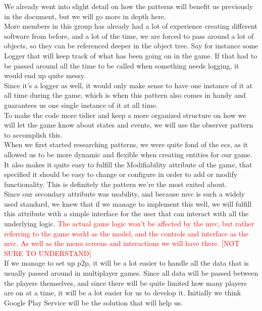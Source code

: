 We already went into slight detail on how the patterns will benefit us previously in the document, but we will go more in depth here. \\

More members in this group has already had a lot of experience creating different software from before, and a lot of the time, we are forced to pass around a lot of objects, so they can be referenced deeper in the object tree. Say for instance some Logger that will keep track of what has been going on in the game. If that had to be passed around all the time to be called when something needs logging, it would end up quite messy. \\

Since it's a logger as well, it would only make sense to have one instance of it at all time during the game, which is when this pattern also comes in handy and guarantees us one single instance of it at all time. \\

To make the code more tidier and keep a more organized structure on how we will let the game know about states and events, we will use the observer pattern to accomplish this. \\

When we first started researching patterns, we were quite fond of the \gls{ecs}, as it allowed us to be more dynamic and flexible when creating entities for our game. It also makes it quite easy to fulfill the Modifiability attribute of the game, that specified it should be easy to change or configure in order to add or modify functionality. This is definitely the pattern we're the most exited about. \\

Since our secondary attribute was usability, and because \gls{mvc} is such a widely used standard, we knew that if we manage to implement this well, we will fulfill this attribute with a simple interface for the user that can interact with all the underlying logic. \textcolor{red}{The actual game logic won't be affected by the \gls{mvc}, but rather referring to the game world as the model, and the controls and interface as the \gls{mvc}. As well as the menu screens and interactions we will have there. [NOT SURE TO UNDERSTAND]} \\

If we manage to set up \gls{p2p}, it will be a lot easier to handle all the data that is usually passed around in multiplayer games. Since all data will be passed between the players themselves, and since there will be quite limited how many players are on at a time, it will be a lot easier for us to develop it. Initially we think Google Play Service will be the solution that will help us.
